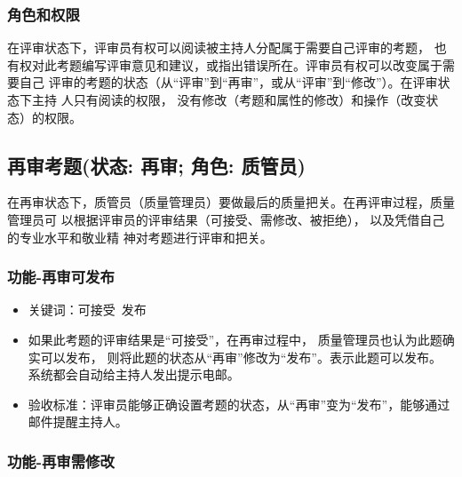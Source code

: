 \documentclass[hyperref, a4paper]{ctexart}
\providecommand{\tightlist}{%
  \setlength{\itemsep}{0pt}\setlength{\parskip}{0pt}}
\begin{document}
\hypertarget{ux89d2ux8272ux548cux6743ux9650}{%
\subsubsection{角色和权限}\label{ux89d2ux8272ux548cux6743ux9650}}

在评审状态下，评审员有权可以阅读被主持人分配属于需要自己评审的考题，
也有权对此考题编写评审意见和建议，或指出错误所在。评审员有权可以改变属于需要自己
评审的考题的状态（从``评审''到``再审''，或从``评审''到``修改''）。在评审状态下主持
人只有阅读的权限，
没有修改（考题和属性的修改）和操作（改变状态）的权限。

\hypertarget{ux518dux5ba1ux8003ux9898ux72b6ux6001-ux518dux5ba1-ux89d2ux8272-ux8d28ux7ba1ux5458}{%
\subsection{再审考题(状态: 再审; 角色:
质管员)}\label{ux518dux5ba1ux8003ux9898ux72b6ux6001-ux518dux5ba1-ux89d2ux8272-ux8d28ux7ba1ux5458}}

在再审状态下，质管员（质量管理员）要做最后的质量把关。在再评审过程，质量管理员可
以根据评审员的评审结果（可接受、需修改、被拒绝），
以及凭借自己的专业水平和敬业精 神对考题进行评审和把关。

\hypertarget{ux529fux80fd-ux518dux5ba1ux53efux53d1ux5e03}{%
\subsubsection{功能-再审可发布}\label{ux529fux80fd-ux518dux5ba1ux53efux53d1ux5e03}}

\begin{itemize}
\tightlist
\item
  关键词：可接受~发布
\item
  如果此考题的评审结果是``可接受''，在再审过程中，
  质量管理员也认为此题确实可以发布，
  则将此题的状态从``再审''修改为``发布''。表示此题可以发布。
  系统都会自动给主持人发出提示电邮。
\item
  验收标准：评审员能够正确设置考题的状态，从``再审''变为``发布''，能够通过邮件提醒主持人。
\end{itemize}

\hypertarget{ux529fux80fd-ux518dux5ba1ux9700ux4feeux6539}{%
\subsubsection{功能-再审需修改}\label{ux529fux80fd-ux518dux5ba1ux9700ux4feeux6539}}
\end{document}
